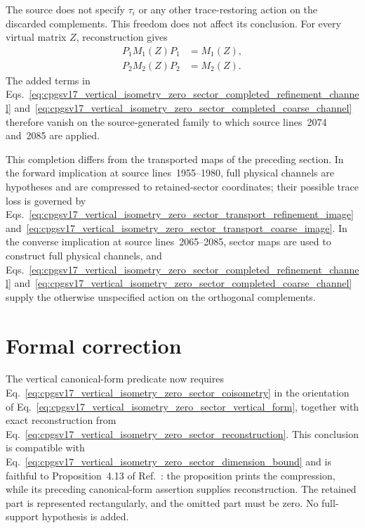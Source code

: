 \documentclass{article}
\begin{document}
The source does not specify $\tau_i$ or any other trace-restoring action on the
discarded complements. This freedom does not affect its conclusion. For every
virtual matrix $Z$, reconstruction gives
\begin{align}
    P_1M_1(Z)P_1
        &=M_1(Z),
    \label{eq:cpgsv17_vertical_isometry_zero_sector_one_site_source_support}\\
    P_2M_2(Z)P_2
        &=M_2(Z).
    \label{eq:cpgsv17_vertical_isometry_zero_sector_two_site_source_support}
\end{align}
The added terms in
Eqs.~\ref{eq:cpgsv17_vertical_isometry_zero_sector_completed_refinement_channel}
and~\ref{eq:cpgsv17_vertical_isometry_zero_sector_completed_coarse_channel}
therefore vanish on the source-generated family to which source
lines~2074 and~2085 are applied.

This completion differs from the transported maps of the preceding section.
In the forward implication at source lines~1955--1980, full physical channels
are hypotheses and are compressed to retained-sector coordinates; their
possible trace loss is governed by
Eqs.~\ref{eq:cpgsv17_vertical_isometry_zero_sector_transport_refinement_image}
and~\ref{eq:cpgsv17_vertical_isometry_zero_sector_transport_coarse_image}. In
the converse implication at source lines~2065--2085, sector maps are used to
construct full physical channels, and
Eqs.~\ref{eq:cpgsv17_vertical_isometry_zero_sector_completed_refinement_channel}
and~\ref{eq:cpgsv17_vertical_isometry_zero_sector_completed_coarse_channel}
supply the otherwise unspecified action on the orthogonal complements.

\section{Formal correction}

The vertical canonical-form predicate now requires
Eq.~\ref{eq:cpgsv17_vertical_isometry_zero_sector_coisometry} in the
orientation of
Eq.~\ref{eq:cpgsv17_vertical_isometry_zero_sector_vertical_form}, together
with exact reconstruction from
Eq.~\ref{eq:cpgsv17_vertical_isometry_zero_sector_reconstruction}. This
conclusion is compatible with
Eq.~\ref{eq:cpgsv17_vertical_isometry_zero_sector_dimension_bound} and is
faithful to Proposition~4.13 of Ref.~\cite{Cirac2016MPDO_arXiv}: the proposition
prints the compression, while its preceding canonical-form assertion supplies
reconstruction. The retained part is represented rectangularly, and the
omitted part must be zero. No full-support hypothesis is added.
\end{document}
